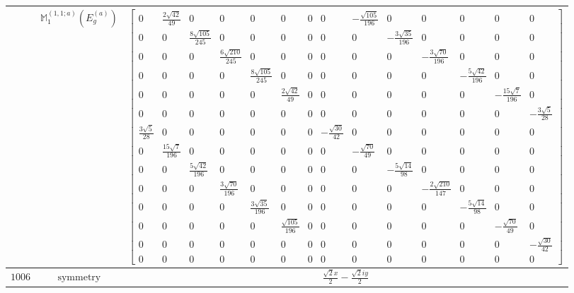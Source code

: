 \documentclass[fleqn,8pt,landscape]{jsarticle}
\begin{document}
\begin{longtable}{ccc}
$  $ & $ \mathbb{M}_{1}^{(1,1;a)}(E_{g}^{(a)}) $ & $ \begin{bmatrix} 0 & \frac{2 \sqrt{42}}{49} & 0 & 0 & 0 & 0 & 0 & 0 & - \frac{\sqrt{105}}{196} & 0 & 0 & 0 & 0 & 0 \\ 0 & 0 & \frac{8 \sqrt{105}}{245} & 0 & 0 & 0 & 0 & 0 & 0 & - \frac{3 \sqrt{35}}{196} & 0 & 0 & 0 & 0 \\ 0 & 0 & 0 & \frac{6 \sqrt{210}}{245} & 0 & 0 & 0 & 0 & 0 & 0 & - \frac{3 \sqrt{70}}{196} & 0 & 0 & 0 \\ 0 & 0 & 0 & 0 & \frac{8 \sqrt{105}}{245} & 0 & 0 & 0 & 0 & 0 & 0 & - \frac{5 \sqrt{42}}{196} & 0 & 0 \\ 0 & 0 & 0 & 0 & 0 & \frac{2 \sqrt{42}}{49} & 0 & 0 & 0 & 0 & 0 & 0 & - \frac{15 \sqrt{7}}{196} & 0 \\ 0 & 0 & 0 & 0 & 0 & 0 & 0 & 0 & 0 & 0 & 0 & 0 & 0 & - \frac{3 \sqrt{5}}{28} \\ \frac{3 \sqrt{5}}{28} & 0 & 0 & 0 & 0 & 0 & 0 & - \frac{\sqrt{30}}{42} & 0 & 0 & 0 & 0 & 0 & 0 \\ 0 & \frac{15 \sqrt{7}}{196} & 0 & 0 & 0 & 0 & 0 & 0 & - \frac{\sqrt{70}}{49} & 0 & 0 & 0 & 0 & 0 \\ 0 & 0 & \frac{5 \sqrt{42}}{196} & 0 & 0 & 0 & 0 & 0 & 0 & - \frac{5 \sqrt{14}}{98} & 0 & 0 & 0 & 0 \\ 0 & 0 & 0 & \frac{3 \sqrt{70}}{196} & 0 & 0 & 0 & 0 & 0 & 0 & - \frac{2 \sqrt{210}}{147} & 0 & 0 & 0 \\ 0 & 0 & 0 & 0 & \frac{3 \sqrt{35}}{196} & 0 & 0 & 0 & 0 & 0 & 0 & - \frac{5 \sqrt{14}}{98} & 0 & 0 \\ 0 & 0 & 0 & 0 & 0 & \frac{\sqrt{105}}{196} & 0 & 0 & 0 & 0 & 0 & 0 & - \frac{\sqrt{70}}{49} & 0 \\ 0 & 0 & 0 & 0 & 0 & 0 & 0 & 0 & 0 & 0 & 0 & 0 & 0 & - \frac{\sqrt{30}}{42} \\ 0 & 0 & 0 & 0 & 0 & 0 & 0 & 0 & 0 & 0 & 0 & 0 & 0 & 0 \end{bmatrix} $ \\ \hline
$ 1006 $ & $ \text{symmetry} $ & $ \frac{\sqrt{2} x}{2} - \frac{\sqrt{2} i y}{2} $ \\

\end{longtable}
\end{document}
